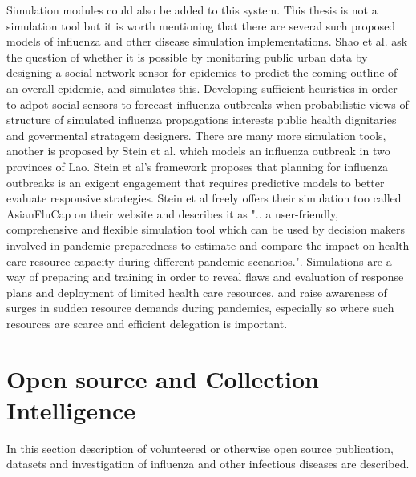 Simulation modules could also be added to this system. This thesis is not a simulation tool but it is worth mentioning that there are several such proposed models of influenza and other disease simulation implementations. Shao et al. \cite{shao2016forecasting} ask the question of whether it is possible by monitoring public urban data by designing a social network sensor for epidemics to predict the coming outline of an overall epidemic, and simulates this. Developing sufficient heuristics in order to adpot social sensors to forecast influenza outbreaks when probabilistic views of structure of simulated influenza propagations interests public health dignitaries and govermental stratagem designers. There are many more simulation tools, another is proposed by Stein et al. \cite{stein2012development} which models an influenza outbreak in two provinces of Lao. Stein et al's framework proposes that planning for influenza outbreaks is an exigent engagement that requires predictive models to better evaluate responsive strategies. Stein et al freely offers their simulation too called AsianFluCap on their website and describes it as ".. a user-friendly, comprehensive and flexible simulation tool which can be used by decision makers involved in pandemic preparedness to estimate and compare the impact on health care resource capacity during different pandemic scenarios.". Simulations are a way of preparing and training in order to reveal flaws and evaluation of response plans and deployment of limited health care resources, and raise awareness of surges in sudden resource demands during pandemics, especially so where such resources are scarce and efficient delegation is important.


\section{Open source and Collection Intelligence}
In this section description of volunteered or otherwise open source publication, datasets and investigation of influenza and other infectious diseases are described.


